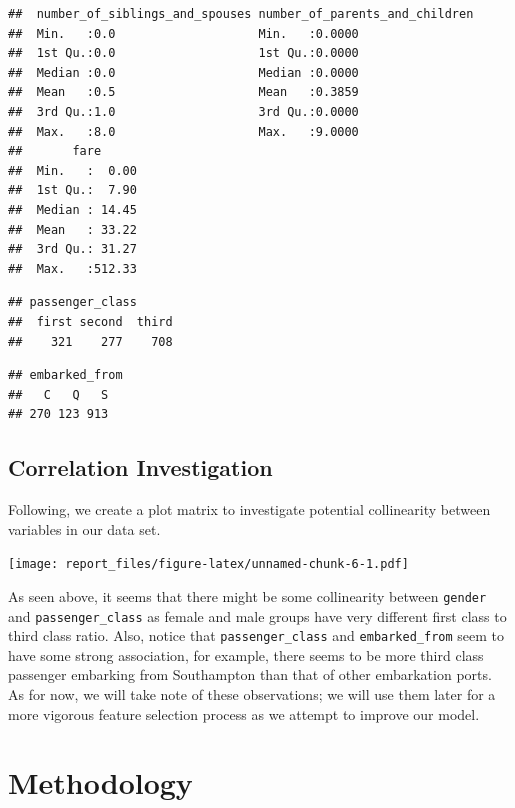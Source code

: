\documentclass[12pt, oneside]{book}
\theoremstyle{definition}
\theoremstyle{definition}
\theoremstyle{definition}
\theoremstyle{remark}
\begin{document}
\begin{verbatim}
##  number_of_siblings_and_spouses number_of_parents_and_children
##  Min.   :0.0                    Min.   :0.0000                
##  1st Qu.:0.0                    1st Qu.:0.0000                
##  Median :0.0                    Median :0.0000                
##  Mean   :0.5                    Mean   :0.3859                
##  3rd Qu.:1.0                    3rd Qu.:0.0000                
##  Max.   :8.0                    Max.   :9.0000                
##       fare       
##  Min.   :  0.00  
##  1st Qu.:  7.90  
##  Median : 14.45  
##  Mean   : 33.22  
##  3rd Qu.: 31.27  
##  Max.   :512.33
\end{verbatim}

\begin{verbatim}
## passenger_class
##  first second  third 
##    321    277    708
\end{verbatim}

\begin{verbatim}
## embarked_from
##   C   Q   S 
## 270 123 913
\end{verbatim}

\hypertarget{correlation-investigation}{%
\section{Correlation Investigation}\label{correlation-investigation}}

Following, we create a plot matrix to investigate potential collinearity
between variables in our data set.

\texttt{[image: report\_files/figure-latex/unnamed-chunk-6-1.pdf]}

As seen above, it seems that there might be some collinearity between
\texttt{gender} and \texttt{passenger\_class} as female and male groups
have very different first class to third class ratio. Also, notice that
\texttt{passenger\_class} and \texttt{embarked\_from} seem to have some
strong association, for example, there seems to be more third class
passenger embarking from Southampton than that of other embarkation
ports. As for now, we will take note of these observations; we will use
them later for a more vigorous feature selection process as we attempt
to improve our model.

\hypertarget{method}{%
\chapter{Methodology}\label{method}}
\end{document}
